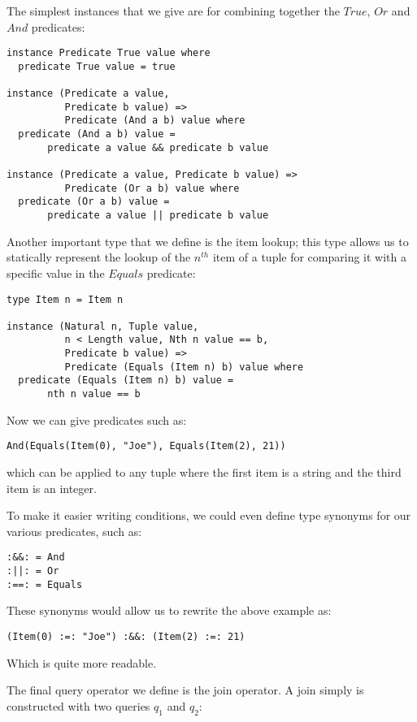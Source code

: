 The simplest instances that we give are for combining together the $True$, $Or$ and $And$ predicates:
\begin{lstlisting}
instance Predicate True value where
  predicate True value = true

instance (Predicate a value, 
          Predicate b value) => 
          Predicate (And a b) value where
  predicate (And a b) value = 
       predicate a value && predicate b value

instance (Predicate a value, Predicate b value) => 
          Predicate (Or a b) value where
  predicate (Or a b) value = 
       predicate a value || predicate b value
\end{lstlisting}

Another important type that we define is the item lookup; this type allows us to statically represent the lookup of the $n^{th}$ item of a tuple for comparing it with a specific value in the $Equals$ predicate:

\begin{lstlisting}
type Item n = Item n

instance (Natural n, Tuple value, 
          n < Length value, Nth n value == b, 
          Predicate b value) => 
          Predicate (Equals (Item n) b) value where
  predicate (Equals (Item n) b) value = 
       nth n value == b
\end{lstlisting}

Now we can give predicates such as:
\begin{lstlisting}
And(Equals(Item(0), "Joe"), Equals(Item(2), 21))
\end{lstlisting}

which can be applied to any tuple where the first item is a string and the third item is an integer.

To make it easier writing conditions, we could even define type synonyms for our various predicates, such as:

\begin{lstlisting}
:&&: = And
:||: = Or
:==: = Equals
\end{lstlisting}

These synonyms would allow us to rewrite the above example as:

\begin{lstlisting}
(Item(0) :=: "Joe") :&&: (Item(2) :=: 21)
\end{lstlisting}

Which is quite more readable.

The final query operator we define is the join operator. A join simply is constructed with two queries $q_1$ and $q_2$:

